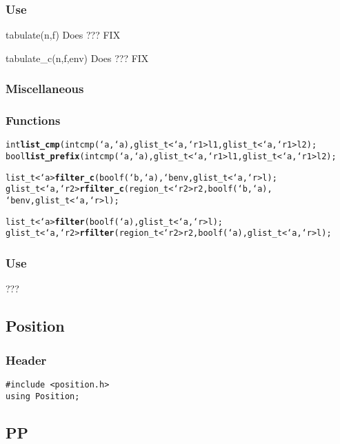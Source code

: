 \subsubsection*{Use}

\begin{defun}{tabulate}{(n,f)}
Does ??? FIX
\end{defun}

\begin{defun}{tabulate_c}{(n,f,env)}
Does ??? FIX
\end{defun}

\subsubsection*{Miscellaneous}
\subsubsection*{Functions}
\begin{alltt}
int  \textbf{list_cmp}(int cmp(`a,`a), glist_t<`a,`r1> l1, glist_t<`a,`r1> l2);
bool \textbf{list_prefix}(int cmp(`a,`a), glist_t<`a,`r1> l1, glist_t<`a,`r1> l2);

list_t<`a>      \textbf{filter_c}(bool f(`b,`a), `b env, glist_t<`a,`r> l);
glist_t<`a,`r2> \textbf{rfilter_c}(region_t<`r2> r2, bool f(`b,`a),
                          `b env, glist_t<`a,`r> l);

list_t<`a>      \textbf{filter}(bool f(`a), glist_t<`a,`r> l);
glist_t<`a,`r2> \textbf{rfilter}(region_t<`r2> r2,bool f(`a),glist_t<`a,`r> l);
\end{alltt}

\subsubsection*{Use}

???

\subsection{Position}

\subsubsection*{Header}
\begin{verbatim}
#include <position.h>
using Position;
\end{verbatim}

\subsection{PP}

